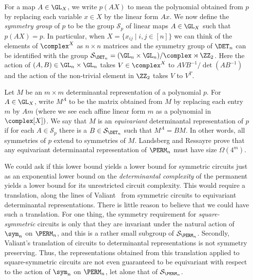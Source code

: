 \documentclass{toc}
\begin{document}
For a map $A \in \GL_X$, we write $p(AX)$ to mean the polynomial obtained from $p$ by replacing each variable $x \in X$ by the linear form $Ax$.  We now define the \emph{symmetry group} of $p$ to be the group $\mathcal{S}_p$ of linear maps $A \in \GL_X$ such that $p(AX) = p$.  In particular, when $X = \{x_{ij} \mid i,j \in [n] \}$ we can think of the elements of $\complex^X$ as $n \times n$ matrices and the symmetry group of $\DET_n$ can be identified with the group $\mathcal{S}_{\DET_n} = (\GL_n \times \GL_n)/\complex \rtimes \ZZ_2$.  Here the action of $(A,B) \in  \GL_n \times \GL_n$ takes $V \in \complex^X$ to $AVB^{-1}/\det(AB^{-1})$ and the action of the non-trivial element in $\ZZ_2$ takes $V$ to $V^T$.

Let  $M$ be an $m\times m$ determinantal representation of a polynomial $p$.  For $A \in \GL_X$, write $M^A$ to be the matrix obtained from $M$ by replacing each entry $m$ by $Am$ (where we see each affine linear form $m$ as a polynomial in $\complex[X])$.   We say that $M$ is an \emph{equivariant} determinantal representation of $p$ if for each $A \in \mathcal{S}_p$ there is a $B \in \mathcal{S}_{\DET_n}$ such that $M^A = BM$.  In other words, all symmetries of $p$ extend to symmetries of $M$.    Landsberg and Ressayre prove that any equivariant determinantal representation of $\PERM_n$ must have size $\Omega(4^m)$.

We could ask if this lower bound yields a lower bound for symmetric circuits just as an exponential lower bound on the \emph{determinantal complexity} of the permanent yields a lower bound for its unrestricted circuit complexity.  This would require a translation, along the lines of Valiant~\cite{Valiant79} from symmetric circuits to equivariant determinantal representations.  There is little reason to believe that we could have such a translation.  For one thing, the symmetry requirement for
\emph{square-symmetric} %
circuits is only that they are invariant under the natural action of $\sym_n$ on $\PERM_n$, and this is a rather small subgroup of $\mathcal{S}_{\PERM_n}$.  Secondly, Valiant's translation of circuits to determinantal representations is not symmetry preserving.  Thus, the representations obtained from this translation applied to
square-symmetric %
circuits are not even guaranteed to be equivariant with respect to the action of $\sym_n$ on $\PERM_n$, let alone that of $\mathcal{S}_{\PERM_n}$.
\end{document}

